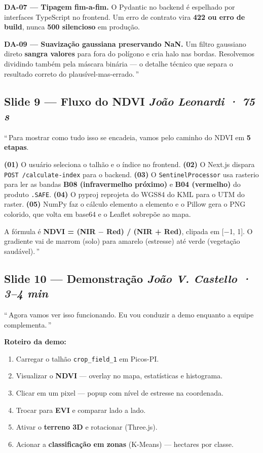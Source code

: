 \documentclass[12pt,a4paper]{article}
\begin{document}
\textbf{DA-07 — Tipagem fim-a-fim.} O Pydantic no backend é
espelhado por interfaces TypeScript no frontend. Um erro de contrato
vira \textbf{422 ou erro de build}, nunca \textbf{500 silencioso} em
produção.

\textbf{DA-09 — Suavização gaussiana preservando NaN.} Um filtro
gaussiano direto \textbf{sangra valores} para fora do polígono e cria
halo nas bordas. Resolvemos dividindo também pela máscara binária — o
detalhe técnico que separa o resultado correto do
plausível-mas-errado.\,\textquotedblright

\subsection*{Slide 9 — Fluxo do NDVI \hfill \textit{João Leonardi · 75 s}}

\textquotedblleft\,Para mostrar como tudo isso se encadeia, vamos pelo
caminho do NDVI em \textbf{5 etapas}.

\textbf{(01)} O usuário seleciona o talhão e o índice no frontend.
\textbf{(02)} O Next.js dispara \texttt{POST /calculate-index} para o
backend. \textbf{(03)} O \texttt{SentinelProcessor} usa rasterio para
ler as bandas \textbf{B08 (infravermelho próximo)} e \textbf{B04
(vermelho)} do produto \texttt{.SAFE}. \textbf{(04)} O pyproj reprojeta
do WGS84 do KML para o UTM do raster. \textbf{(05)} NumPy faz o cálculo
elemento a elemento e o Pillow gera o PNG colorido, que volta em base64
e o Leaflet sobrepõe ao mapa.

A fórmula é \textbf{NDVI = (NIR $-$ Red) / (NIR + Red)}, clipada em
[$-$1, 1]. O gradiente vai de marrom (solo) para amarelo (estresse) até
verde (vegetação saudável).\,\textquotedblright

\subsection*{Slide 10 — Demonstração \hfill \textit{João V. Castello · 3--4 min}}

\textquotedblleft\,Agora vamos ver isso funcionando. Eu vou conduzir a
demo enquanto a equipe complementa.\,\textquotedblright

\textbf{Roteiro da demo:}
\begin{enumerate}[label=\textbf{0\arabic*}]
  \item Carregar o talhão \texttt{crop\_field\_1} em Picos-PI.
  \item Visualizar o \textbf{NDVI} — overlay no mapa, estatísticas e histograma.
  \item Clicar em um pixel — popup com nível de estresse na coordenada.
  \item Trocar para \textbf{EVI} e comparar lado a lado.
  \item Ativar o \textbf{terreno 3D} e rotacionar (Three.js).
  \item Acionar a \textbf{classificação em zonas} (K-Means) — hectares por classe.
\end{enumerate}
\end{document}
